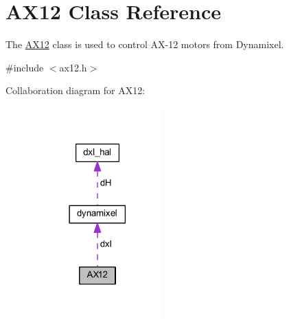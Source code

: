 \hypertarget{class_a_x12}{}\section{A\+X12 Class Reference}
\label{class_a_x12}


The \hyperlink{class_a_x12}{A\+X12} class is used to control A\+X-\/12 motors from Dynamixel.  




{\ttfamily \#include $<$ax12.\+h$>$}



Collaboration diagram for A\+X12\+:\nopagebreak
\begin{figure}[H]
\begin{center}
\leavevmode
\includegraphics[width=141pt]{d4/dc1/class_a_x12__coll__graph}
\end{center}
\end{figure}
